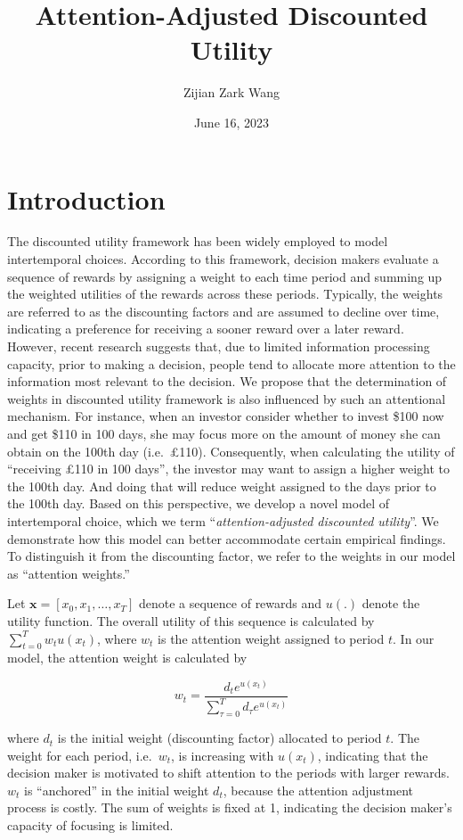 \documentclass[
  12pt,
]{article}
\title{Attention-Adjusted Discounted Utility}
\author{Zijian Zark Wang}
\date{June 16, 2023}
\begin{document}
\maketitle

\hypertarget{introduction}{%
\section{Introduction}\label{introduction}}

The discounted utility framework has been widely employed to model
intertemporal choices. According to this framework, decision makers
evaluate a sequence of rewards by assigning a weight to each time period
and summing up the weighted utilities of the rewards across these
periods. Typically, the weights are referred to as the discounting
factors and are assumed to decline over time, indicating a preference
for receiving a sooner reward over a later reward. However, recent
research suggests that, due to limited information processing capacity,
prior to making a decision, people tend to allocate more attention to
the information most relevant to the decision. We propose that the
determination of weights in discounted utility framework is also
influenced by such an attentional mechanism. For instance, when an
investor consider whether to invest \$100 now and get \$110 in 100 days,
she may focus more on the amount of money she can obtain on the 100th
day (i.e.~£110). Consequently, when calculating the utility of
``receiving £110 in 100 days'', the investor may want to assign a higher
weight to the 100th day. And doing that will reduce weight assigned to
the days prior to the 100th day. Based on this perspective, we develop a
novel model of intertemporal choice, which we term
``\emph{attention-adjusted discounted utility}''. We demonstrate how
this model can better accommodate certain empirical findings. To
distinguish it from the discounting factor, we refer to the weights in
our model as ``attention weights.''

Let \(\textbf{x} = [x_0, x_1, …, x_T]\) denote a sequence of rewards and
\(u(.)\) denote the utility function. The overall utility of this
sequence is calculated by \(\sum_{t=0}^T w_t u(x_t)\), where \(w_t\) is
the attention weight assigned to period \(t\). In our model, the
attention weight is calculated by

\[
w_t = \frac{d_t e^{u(x_t)}}{\sum_{\tau=0}^T d_\tau e^{u(x_t)}}
\]

where \(d_t\) is the initial weight (discounting factor) allocated to
period \(t\). The weight for each period, i.e.~\(w_t\), is increasing
with \(u(x_t)\), indicating that the decision maker is motivated to
shift attention to the periods with larger rewards. \(w_t\) is
``anchored'' in the initial weight \(d_t\), because the attention
adjustment process is costly. The sum of weights is fixed at 1,
indicating the decision maker's capacity of focusing is limited.
\end{document}
